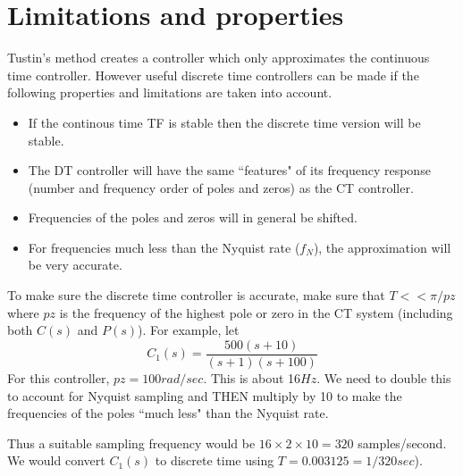 \section{Limitations and properties}\label{Limitations}
 Tustin's method creates a controller which only approximates the continuous time controller. However useful discrete time controllers can be made if the following properties and limitations are taken into account.	%

\begin{itemize}
  \item If the continous time TF is stable then the discrete time version will be stable.
  \item The DT controller will have the same ``features"  of its frequency response (number and frequency order of poles and zeros) as the CT controller.
  \item Frequencies of the poles and zeros will in general be shifted.
  \item For frequencies much less than the Nyquist rate ($f_N$), the approximation will be very accurate.
\end{itemize}


To make sure the discrete time controller is accurate, make sure that $T<<\pi/pz$ where $pz$ is the frequency of the highest pole or zero in the CT system (including both $C(s)$ and $P(s)$).   For example, let
\[
C_1(s) = \frac{500(s+10)}{(s+1)(s+100)}
\]
For this controller, $pz = 100rad/sec$.   This is about 16$Hz$.
We need to double this to account for Nyquist sampling and THEN multiply by 10 to make the frequencies of the poles ``much less" than the Nyquist rate.

Thus a suitable sampling frequency would be $16\times2\times10 = 320$ samples/second.  We would convert $C_1(s)$ to discrete time using $T=0.003125 = 1/320 sec$).




